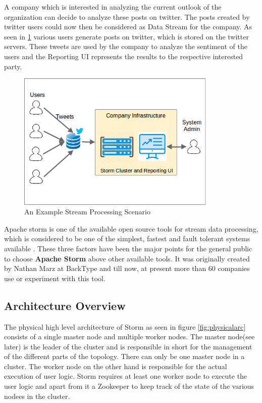 \documentclass[runningheads,a4paper]{llncs}[2015/06/24]
\begin{document}
A company which is interested in analyzing the current outlook of the organization can decide to analyze these posts on twitter. The posts created by twitter users could now then be considered as Data Stream for the company. As seen in \ref{fig:example} various users generate posts on twitter, which is stored on the twitter servers. These tweets are used by the company to analyze the sentiment of the users and the Reporting UI represents the results to the respective interested party.

\begin{figure}
  \begin{center}
    \includegraphics[width=0.85\textwidth]{example.png}
    \caption{An Example Stream Processing Scenario}
    \label{fig:example}
   \end{center}
\end{figure}

Apache storm is one of the available open source tools for stream data processing, which is considered to be one of the simplest, fastest and fault tolerant systems available \cite{stormperspective}. These three factors have been the major points for the general public to choose \textbf{Apache Storm} above other available tools. It was originally created by Nathan Marz at BackType and till now, at present more than 60 companies \cite{stormtwitter} use or experiment with this tool.

\subsection{Architecture Overview}
The physical high level architecture of Storm as seen in figure \ref{fig:physicalarc} consists of a single master node and multiple worker nodes. The master node(see later) is the leader of the cluster and is responsible in short for the management of the different parts of the topology. There can only be one master node in a cluster. The worker node on the other hand is responsible for the actual execution of user logic. Storm requires at least one worker node to execute the user logic and apart from it a Zookeeper to keep track of the state of the various nodees in the cluster.
\end{document}
